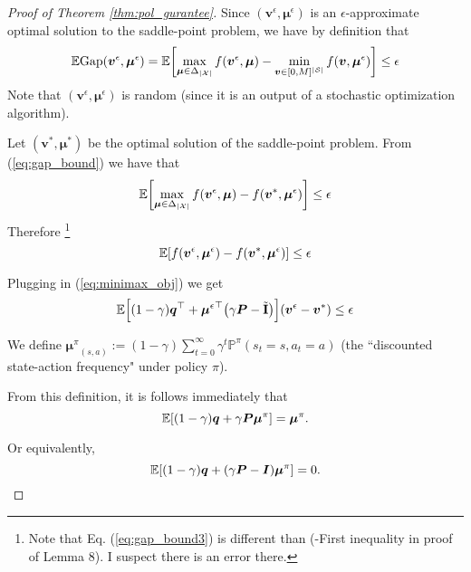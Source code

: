 \documentclass{article}
\DeclarePairedDelimiter\br{(}{)}%
\DeclarePairedDelimiter\brs{[}{]}%
\DeclarePairedDelimiter\abs{\lvert}{\rvert}%
\newcommand{\ntext}[1]{{\text{\normalfont#1}}}
\newcommand{\Prob}{\mathbb{P}}
\newcommand{\E}{\mathbb{E}}
\newcommand{\States}{\mathcal{S}}
\newcommand{\nSt}{{\abs{\States}}}
\newcommand{\nPairs}{{\abs{\mathcal{X}}}}
\newcommand{\Pb}{\boldsymbol{P}}
\newcommand{\vb}{\boldsymbol{v}}
\newcommand{\mub}{\boldsymbol{\mu}}
\newcommand{\vbe}{{\vb^\epsilon}}
\newcommand{\mube}{{\mub^\epsilon}}
\newcommand{\mubpi}{{\mub^\pi}}
\newcommand{\vMax}{M}
\newcommand{\Ibt}{\tilde{\textbf{I}}}
\newcommand{\Ib}{\boldsymbol{I}}
\newcommand{\initDist}{\boldsymbol{q}}
\newcommand{\Gap}{\ntext{Gap}}
\begin{document}
\begin{proof}[Proof of Theorem \ref{thm:pol_gurantee}]
Since $(\vbe, \mube)$ is an $\epsilon$-approximate optimal solution to the saddle-point problem, we have by definition that 
\begin{equation} \label{eq:gap_bound}
    \E \Gap(\vbe, \mube) = \E \brs*{\max_{\mub  \in \Delta_{\nPairs}} f(\vbe, \mub ) -  \min_{\vb  \in [0,\vMax]^{\nSt}} f(\vb, \mube) }\leq \epsilon 
\end{equation}
Note that $(\vbe, \mube)$ is random (since it is an output of a stochastic optimization algorithm).

Let $(\vb^*,\mub^*)$ be the optimal solution of the saddle-point problem.
From (\ref{eq:gap_bound}) we have that
\begin{equation} \label{eq:gap_bound2}
    \E \brs*{\max_{\mub  \in \Delta_{\nPairs}} f(\vbe, \mub ) -  f(\vb^*, \mube) }\leq \epsilon 
\end{equation}
Therefore 
\footnote{Note that Eq. (\ref{eq:gap_bound3}) is different than (\citet{jin20efficiently}-First inequality in proof of Lemma 8). I suspect there is an error there.
 }
\begin{equation} \label{eq:gap_bound3}
    \E \brs*{ f(\vbe, \mube ) -  f(\vb^*, \mube) }\leq \epsilon 
\end{equation}

 Plugging in (\ref{eq:minimax_obj}) we get
\begin{equation} \label{eq:gap_bound4}
    \E \brs*{ (1-\gamma) \initDist^\top +  \mube^\top  \br*{\gamma \Pb - \Ibt}  } \br*{\vbe-\vb^*} \leq \epsilon 
\end{equation}


We define
 $\mubpi_{(s,a)} := (1-\gamma) \sum_{t=0}^{\infty} \gamma^t \Prob^\pi(s_t=s,a_t=a)$
 (the ``discounted state-action frequency" under policy $\pi$).
 
 
 From this definition, it is follows immediately that 
 \begin{equation}
     \E \brs*{(1-\gamma)\initDist + \gamma \Pb \mubpi} = \mubpi.
 \end{equation}
 
 Or equivalently,
  \begin{equation} \label{eq:mupi_stat}
     \E \brs*{(1-\gamma)\initDist + \br{\gamma \Pb  - \Ib} \mubpi} = 0.
 \end{equation}
 

\end{proof}
\end{document}
